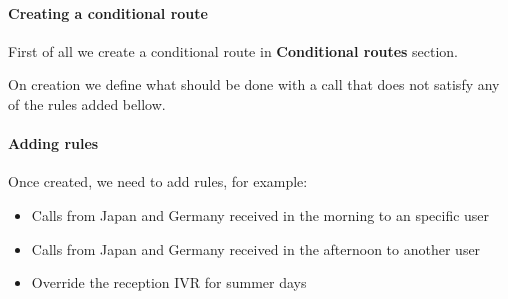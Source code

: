 \documentclass[letterpaper,10pt,spanish]{sphinxmanual}
\begin{document}
\paragraph{Creating a conditional route}
\label{administration_portal/client/vpbx/routing_endpoints/conditional_routes:creating-a-conditional-route}
First of all we create a conditional route in \textbf{Conditional routes} section.

On creation we define what should be done with a call that does not satisfy any
of the rules added bellow.


\paragraph{Adding rules}
\label{administration_portal/client/vpbx/routing_endpoints/conditional_routes:adding-rules}
Once created, we need to add rules, for example:
\begin{itemize}
\item {} 
Calls from Japan and Germany received in the morning to an specific user

\item {} 
Calls from Japan and Germany received in the afternoon to another user

\item {} 
Override the reception IVR for summer days

\end{itemize}
\end{document}
